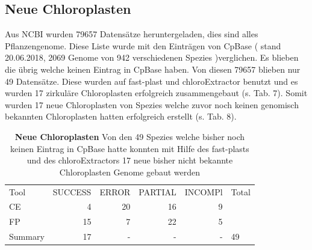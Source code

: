 \documentclass{scrartcl}
\begin{document}
\subsection{Neue Chloroplasten}
\label{sec-4-10}
Aus NCBI wurden 79657 Datensätze heruntergeladen, dies sind alles Pflanzengenome. Diese Liste wurde mit den Einträgen von CpBase ( stand 20.06.2018, 2069 Genome von 942 verschiedenen Spezies )verglichen. 
Es blieben die übrig welche keinen Eintrag in CpBase haben. 
Von diesen 79657 blieben nur 49 Datensätze. Diese wurden auf fast-plast und chloroExtractor benutzt und es wurden 17 zirkuläre Chloroplasten erfolgreich zusammengebaut (s. Tab. 7). 
Somit wurden 17 neue Chloroplasten von Spezies
welche zuvor noch keinen genomisch bekannten Chloroplasten hatten erfolgreich erstellt (s. Tab. 8).
\begin{table}[!h]
\caption[Neue Chloroplasten]{\textbf{Neue Chloroplasten} Von den 49 Spezies welche bisher noch keinen Eintrag in CpBase hatte konnten mit Hilfe des fast-plasts und des chloroExtractors 17 neue bisher nicht bekannte Chloroplasten Genome gebaut werden}
\begin{center}
\begin{tabular}{lrrrrl}
Tool & SUCCESS & ERROR & PARTIAL & INCOMPl & Total\\
CE & 4 & 20 & 16 & 9 & \\
FP & 15 & 7 & 22 & 5 & \\
Summary & 17 & - & - & - & 49\\
\end{tabular}
\end{center}
\end{table}
\end{document}
